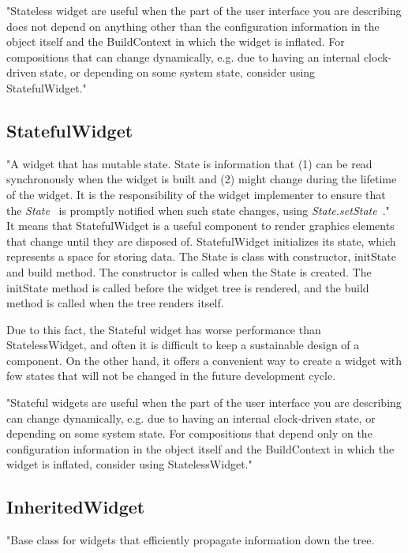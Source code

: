 "Stateless widget are useful when the part of the user interface you are describing does not depend on anything other than the configuration information in the object itself and the BuildContext in which the widget is inflated.
For compositions that can change dynamically, e.g. due to having an internal clock-driven state, or depending on some system state, consider using StatefulWidget."~\cite{statelessWidget}


\subsection{StatefulWidget}\label{subsec:statefulwidget}
"A widget that has mutable state.
State is information that (1) can be read synchronously when the widget is built and (2) might change during the lifetime of the widget.
It is the responsibility of the widget implementer to ensure that the \textit{State}~\cite{state} is promptly notified when such state changes, using \textit{State.setState}~\cite{setState}."~\cite{statefulWidget}
It means that StatefulWidget is a useful component to render graphics elements that change until they are disposed of.
StatefulWidget initializes its state, which represents a space for storing data.
The State is class with constructor, initState and build method.
The constructor is called when the State is created.
The initState method is called before the widget tree is rendered, and the build method is called when the tree renders itself.

Due to this fact, the Stateful widget has worse performance than StatelessWidget, and often it is difficult to keep a sustainable design of a component.
On the other hand, it offers a convenient way to create a widget with few states that will not be changed in the future development cycle.

"Stateful widgets are useful when the part of the user interface you are describing can change dynamically, e.g. due to having an internal clock-driven state, or depending on some system state.
For compositions that depend only on the configuration information in the object itself and the BuildContext in which the widget is inflated, consider using StatelessWidget."~\cite{statefulWidget}


\subsection{InheritedWidget}\label{subsec:inheritedwidget}
"Base class for widgets that efficiently propagate information down the tree.

